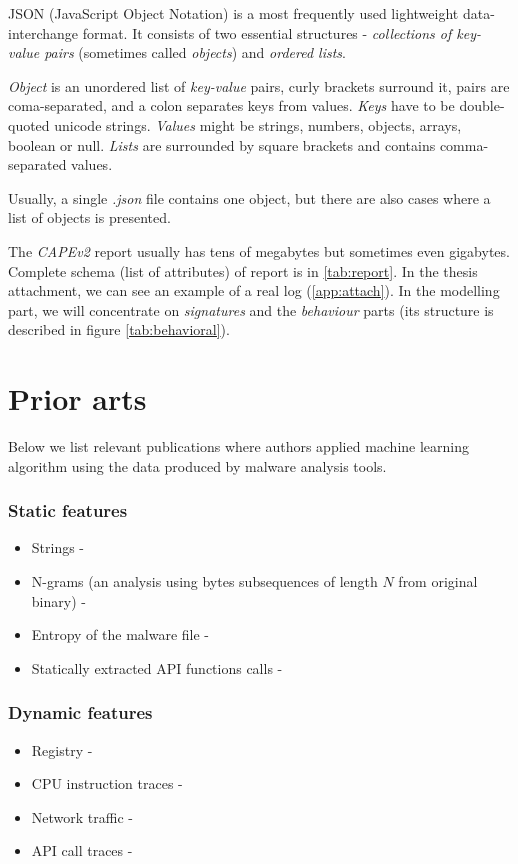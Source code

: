 JSON (JavaScript Object Notation) is a most frequently used lightweight data-interchange format. It consists of two essential structures - \emph{collections of key-value pairs} (sometimes called \emph{objects}) and \emph{ordered lists}. 

\emph{Object} is an unordered list of \emph{key-value} pairs, curly brackets surround it, pairs are coma-separated, and a colon separates keys from values. \emph{Keys} have to be double-quoted unicode strings. \emph{Values} might be strings, numbers, objects, arrays, boolean or null. \emph{Lists} are surrounded by square brackets and contains comma-separated values.

Usually, a single \emph{.json} file contains one object, but there are also cases where a list of objects is presented.

The \emph{CAPEv2} report usually has tens of megabytes but sometimes even gigabytes. Complete schema (list of attributes) of report is in \ref{tab:report}. In the thesis attachment, we can see an example of a real log (\ref{app:attach}). In the modelling part, we will concentrate on \emph{signatures} and the \emph{behaviour} parts (its structure is described in figure \ref{tab:behavioral}).


\section{Prior arts}
Below we list relevant publications where authors applied machine learning algorithm using the data produced by malware analysis tools.
\subsubsection{Static features}
\begin{itemize}
  \itemsep0em 
  \item Strings - \cite{Lee2011}
  \item N-grams (an analysis using bytes subsequences of length $N$ from original binary) - \cite{Fuyong2017}
  \item Entropy of the malware file - \cite{Wojnowicz2018}
  \item Statically extracted API functions calls - \cite{Ahmadi2016}
\end{itemize}

\subsubsection{Dynamic features}
\begin{itemize}
  \itemsep0em 
  \item Registry - \cite{Ghiasi2015}
  \item CPU instruction traces - \cite{Carlin2017}
  \item Network traffic - \cite{Boukhtouta2015}
  \item API call traces -  \cite{Galal2015}
\end{itemize}

